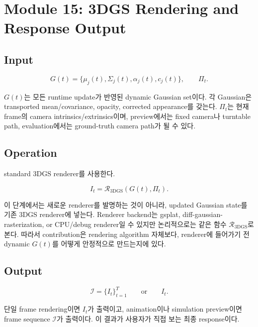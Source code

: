 \documentclass[11pt,a4paper]{article}
\begin{document}
\section{Module 15: 3DGS Rendering and Response Output}

\subsection*{Input}

\begin{equation}
G(t)=\{\mu_j(t),\Sigma_j(t),\alpha_j(t),c_j(t)\},\qquad \Pi_t.
\end{equation}

$G(t)$는 모든 runtime update가 반영된 dynamic Gaussian set이다.
각 Gaussian은 transported mean/covariance, opacity, corrected appearance를 갖는다.
$\Pi_t$는 현재 frame의 camera intrinsics/extrinsics이며, preview에서는 fixed camera나 turntable path, evaluation에서는 ground-truth camera path가 될 수 있다.

\subsection*{Operation}

standard 3DGS renderer를 사용한다.

\begin{equation}
I_t=\mathcal{R}_{\mathrm{3DGS}}(G(t),\Pi_t).
\end{equation}

이 단계에서는 새로운 renderer를 발명하는 것이 아니라, updated Gaussian state를 기존 3DGS renderer에 넣는다.
Renderer backend는 gsplat, diff-gaussian-rasterization, or CPU/debug renderer일 수 있지만 논리적으로는 같은 함수 $\mathcal{R}_{\mathrm{3DGS}}$로 본다.
따라서 contribution은 rendering algorithm 자체보다, renderer에 들어가기 전 dynamic $G(t)$를 어떻게 안정적으로 만드는지에 있다.

\subsection*{Output}

\begin{equation}
\boxed{\mathcal{I}=\{I_t\}_{t=1}^{T}}\qquad \text{or}\qquad \boxed{I_t}.
\end{equation}

단일 frame rendering이면 $I_t$가 출력이고, animation이나 simulation preview이면 frame sequence $\mathcal{I}$가 출력이다.
이 결과가 사용자가 직접 보는 최종 response이다.
\end{document}
